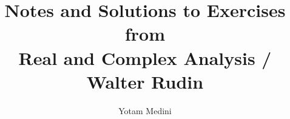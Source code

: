 \newcommand{\C}{\mathbb{C}} %
\newcommand{\calB}{\ensuremath{\mathcal{B}}}
\newcommand{\calG}{\ensuremath{\mathcal{G}}}
\newcommand{\scrP}{\ensuremath{\mathscr{P}}}
\newcommand{\scrQ}{\ensuremath{\mathscr{Q}}}
\newcommand{\Lp}[1]{\ensuremath{\mathbf{L}^{#1}}} %
\newcommand{\N}{\mathbb{N}} %
\newcommand{\Q}{\ensuremath{\mathbb{Q}}} %
\newcommand{\R}{\ensuremath{\mathbb{R}}} %
\newcommand{\Z}{\ensuremath{\mathbb{Z}}} %
\newcommand{\intR}{\int_{-\infty}^{\infty}} %

\newcommand{\seq}[2]{\ensuremath{#1_1,\ldots,#1_{#2}}}
\newcommand{\seqn}[1]{\seq{#1}{n}}
\newcommand{\seqan}{\seq{a}{n}}
\newcommand{\seqxn}{\seq{x}{n}}
\newcommand{\seqalphn}{\seq{\alpha}{n}}

\newcommand{\ich}[1]{(\textit{#1})}
\newcommand{\itemch}[1]{\item[\ich{#1}]}


\title{Notes and Solutions to Exercises \\
          from \\
       Real and Complex Analysis / Walter Rudin}
\author{Yotam Medini}


\newtheorem{thm}{Theorem}[chapter]
\newtheorem{cor}[thm]{Corollary}
\newtheorem{Def}{Definition}
\newtheorem{lem}[thm]{Lemma}
\newtheorem{llem}[thm]{Local Lemma}
\newtheorem{lthm}[thm]{Local Theorem}

\newtheorem{quotethm}{Theorem}[chapter]


\newcommand{\proofend}{\hfill\(\blacksquare\)}
\newenvironment{thmproof}
{\textbf{Proof.}}
{\proofend}

\newcommand{\chapterTypeout}[1]{\typeout{#1} \chapter{#1}}
\newcommand{\sectionTypeout}[1]{\typeout{#1} \section{#1}}

\newcommand{\fx}{\ensuremath{f(x)}}
\newcommand{\gx}{\ensuremath{g(x)}}
\newcommand{\lrangle}[1]{\ensuremath{\langle #1 \rangle}}
\newcommand{\M}{\ensuremath{\mathfrak{M}}}
\newcommand{\mldots}{\ensuremath{\ldots}}
\newcommand{\salgebra}{\(\sigma\)-algebra}
\newcommand{\wlogy}{without loss of generality}
\newcommand{\Wlogy}{Without loss of generality}


